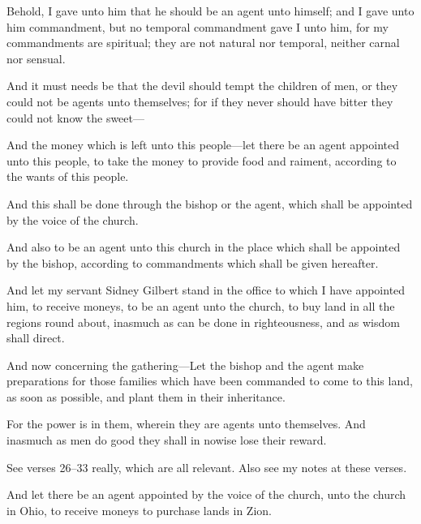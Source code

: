 			\begin{compactdesc}
				\item[{\hyperref[DC29-35]{DC 29:35}}] Behold, I gave unto him that he should be an agent unto himself; and I gave unto him commandment, but no temporal commandment gave I unto him, for my commandments are spiritual; they are not natural nor temporal, neither carnal nor sensual.
				\item[{\hyperref[DC29-39]{DC 29:39}}] And it must needs be that the devil should tempt the children of men, or they could not be agents unto themselves; for if they never should have bitter they could not know the sweet---
				\item[{\hyperref[DC51-8]{DC 51:8}}] And the money which is left unto this people---let there be an agent appointed unto this people, to take the money to provide food and raiment, according to the wants of this people.
				\item[{\hyperref[DC51-12]{DC 51:12}}] And this shall be done through the bishop or the agent, which shall be appointed by the voice of the church.
				\item[{\hyperref[DC53-4]{DC 53:4}}] And also to be an agent unto this church in the place which shall be appointed by the bishop, according to commandments which shall be given hereafter.
				\item[{\hyperref[DC57-6]{DC 57:6}}] And let my servant Sidney Gilbert stand in the office to which I have appointed him, to receive moneys, to be an agent unto the church, to buy land in all the regions round about, inasmuch as can be done in righteousness, and as wisdom shall direct.
				\item[{\hyperref[DC57-15]{DC 57:15}}] And now concerning the gathering---Let the bishop and the agent make preparations for those families which have been commanded to come to this land, as soon as possible, and plant them in their inheritance.
				\item[{\hyperref[DC58-28]{DC 58:28}}] For the power is in them, wherein they are agents unto themselves.  And inasmuch as men do good they shall in nowise lose their reward.
					\begin{compactitem}
						\item See verses 26--33 really, which are all relevant. Also see my notes at these verses.
					\end{compactitem} 
				\item[{\hyperref[DC58-49]{DC 58:49}}] And let there be an agent appointed by the voice of the church, unto the church in Ohio, to receive moneys to purchase lands in Zion.

\end{compactdesc}
